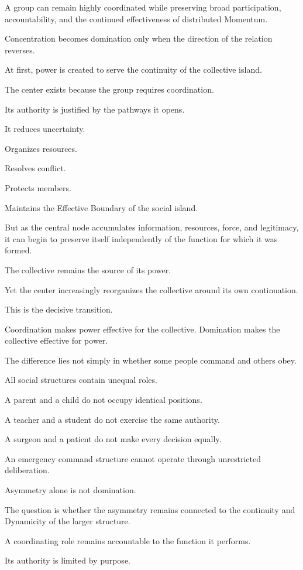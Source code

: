 A group can remain highly coordinated while preserving broad participation, accountability, and the continued effectiveness of distributed Momentum.

Concentration becomes domination only when the direction of the relation reverses.

At first, power is created to serve the continuity of the collective island.

The center exists because the group requires coordination.

Its authority is justified by the pathways it opens.

It reduces uncertainty.

Organizes resources.

Resolves conflict.

Protects members.

Maintains the Effective Boundary of the social island.

But as the central node accumulates information, resources, force, and legitimacy, it can begin to preserve itself independently of the function for which it was formed.

The collective remains the source of its power.

Yet the center increasingly reorganizes the collective around its own continuation.

This is the decisive transition.

Coordination makes power effective for the collective. Domination makes the collective effective for power.

The difference lies not simply in whether some people command and others obey.

All social structures contain unequal roles.

A parent and a child do not occupy identical positions.

A teacher and a student do not exercise the same authority.

A surgeon and a patient do not make every decision equally.

An emergency command structure cannot operate through unrestricted deliberation.

Asymmetry alone is not domination.

The question is whether the asymmetry remains connected to the continuity and Dynamicity of the larger structure.

A coordinating role remains accountable to the function it performs.

Its authority is limited by purpose.

